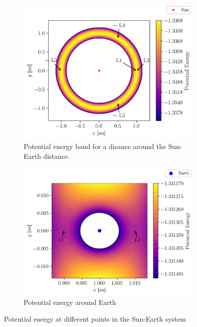 \begin{figure}[h]
    \centering
    \begin{subfigure}{0.48\linewidth}
        \includegraphics[width=\linewidth]{figures/potential_global.png}
        \caption{Potential energy band for a disance around the Sun-Earth distance.}
        \label{fig:lagrange_potential_global}
    \end{subfigure}
    \begin{subfigure}{0.48\linewidth}
        \includegraphics[width=\linewidth]{figures/potential_L1_L2_zoom.png}
        \vspace*{0.2cm}
        \caption{Potential energy around Earth}
        \label{fig:lagrange_L1_L2}
    \end{subfigure}
    \caption{Potential energy at different points in the Sun-Earth system}
\end{figure}

